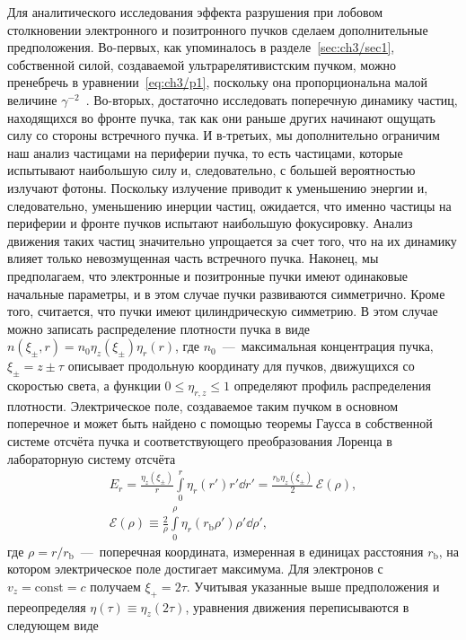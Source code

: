 Для аналитического исследования эффекта разрушения при лобовом столкновении электронного и позитронного пучков сделаем дополнительные предположения.
Во-первых, как упоминалось в разделе~\ref{sec:ch3/sec1}, собственной силой, создаваемой ультрарелятивистским пучком, можно пренебречь в уравнении~\eqref{eq:ch3/p1}, поскольку она пропорциональна малой величине $\gamma^{ -2}$~\cite{davidson2001physics,katsouleas1990plasma}.
Во-вторых, достаточно исследовать поперечную динамику частиц, находящихся во фронте пучка, так как они раньше других начинают ощущать силу со стороны встречного пучка.
И в-третьих, мы дополнительно ограничим наш анализ частицами на периферии пучка, то есть частицами, которые испытывают наибольшую силу и, следовательно, с большей вероятностью излучают фотоны.
Поскольку излучение приводит к уменьшению энергии и, следовательно, уменьшению инерции частиц, ожидается, что именно частицы на периферии и фронте пучков испытают наибольшую фокусировку.
Анализ движения таких частиц значительно упрощается за счет того, что на их динамику влияет только невозмущенная часть встречного пучка.
Наконец, мы предполагаем, что электронные и позитронные пучки имеют одинаковые начальные параметры, и в этом случае пучки развиваются симметрично.
Кроме того, считается, что пучки имеют цилиндрическую симметрию.
В этом случае можно записать распределение плотности пучка в виде ${n(\xi_\pm,r) = n_0 \eta_z(\xi_\pm) \eta_r(r)}$, где $n_0$~---~максимальная концентрация пучка, $ \xi_\pm = z\pm \tau$ описывает продольную координату для пучков, движущихся со скоростью света, а функции $0 \leq \eta_{r,z} \leq 1$ определяют профиль распределения плотности.
Электрическое поле, создаваемое таким пучком в основном поперечное и может быть найдено с помощью теоремы Гаусса в собственной системе отсчёта пучка и соответствующего преобразования Лоренца в лабораторную систему отсчёта
\begin{gather}
    E_r =  \frac{\eta_z(\xi_\pm)}{r}\int\limits_0^r \eta_r(r') r' \dd r'  = \frac{r_\mathrm{b} \eta_z(\xi_\pm)}{2}\, \mathcal{E}(\rho) ,  \label{eq:ch3/efield} \\
    \mathcal{E}(\rho) \equiv \frac{2}{\rho}\int\limits_0^{\rho} \eta_r(r_\mathrm{b} \rho') \rho' \dd \rho',
\end{gather}
где $\rho = r / r_\mathrm{b}$~---~поперечная координата, измеренная в единицах расстояния $r_\mathrm{b}$, на котором электрическое поле достигает максимума.
Для электронов с $v_z= \text{const} = c $ получаем $\xi_+ = 2 \tau$.
Учитывая указанные выше предположения и переопределяя $\eta(\tau) \equiv \eta_z(2\tau)$, уравнения движения переписываются в следующем виде
